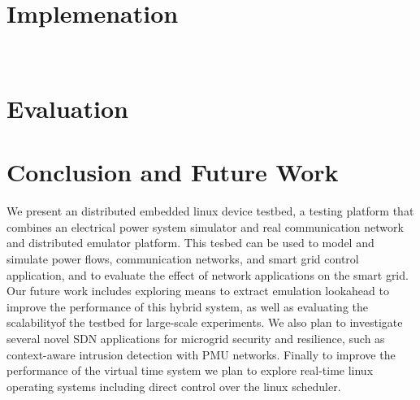 \section{Implemenation}

\

\section{Evaluation}

\section{Conclusion and Future Work}
We present an distributed embedded linux device testbed, a testing platform that combines an
electrical power system simulator and real communication network and distributed emulator platform. This tesbed can be used to model and simulate power flows, communication networks, and smart grid control application, and to evaluate the effect of network applications on the smart grid. Our future work includes
exploring means to extract emulation lookahead to improve
the performance of this hybrid system, as well as evaluating the scalabilityof the testbed for large-scale experiments. We also plan to investigate several novel SDN
applications for microgrid security and resilience, such as context-aware intrusion detection with PMU networks. Finally to improve the performance of the virtual time system we plan to explore real-time linux operating systems including direct control over the linux scheduler.
